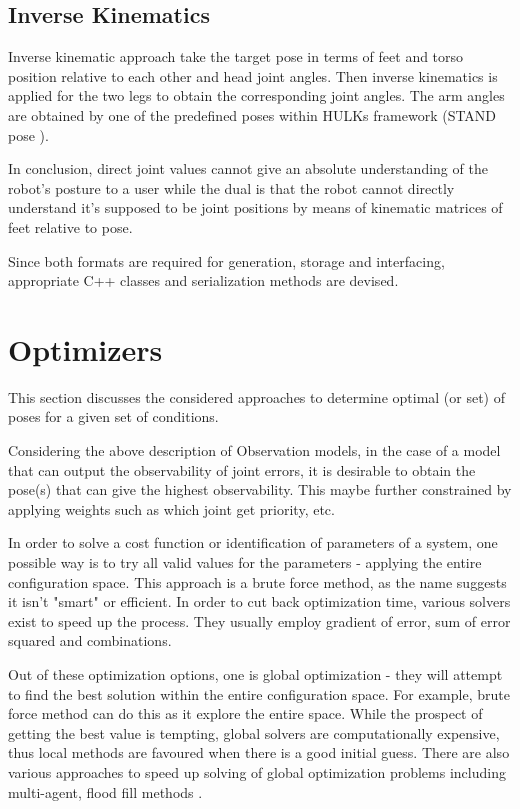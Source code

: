 \documentclass[english, printversion, nomenclature, notitle]{tuvisionthesis} %
\begin{document}
\subsection{Inverse Kinematics}
\label{subsec:inverse_kinematics_gen}

Inverse kinematic approach take the target pose in terms of feet and torso position relative to each other and head joint angles. Then inverse kinematics is applied for the two legs to obtain the corresponding joint angles. The arm angles are obtained by one of the predefined poses within HULKs framework (STAND pose \cite{darshana_adikari_team_2017}).

In conclusion, direct joint values cannot give an absolute understanding of the robot's posture to a user while the dual is that the robot cannot directly understand it's supposed to be joint positions by means of kinematic matrices of feet relative to pose.

Since both formats are required for generation, storage and interfacing, appropriate C++ classes and serialization methods are devised.

\section{Optimizers}

This section discusses the considered approaches to determine optimal (or set) of poses for a given set of conditions.

Considering the above description of Observation models, in the case of a model that can output the observability of joint errors, it is desirable to obtain the pose(s) that can give the highest observability. This maybe further constrained by applying weights such as which joint get priority, etc.

In order to solve a cost function or identification of parameters of a system, one possible way is to try all valid values for the parameters - applying the entire configuration space. This approach is a brute force method, as the name suggests it isn't "smart" or efficient. In order to cut back optimization time, various solvers exist to speed up the process. They usually employ gradient of error, sum of error squared and combinations.

Out of these optimization options, one is global optimization - they will attempt to find the best solution within the entire configuration space. For example, brute force method can do this as it explore the entire space. While the prospect of getting the best value is tempting, global solvers are computationally expensive, thus local methods are favoured when there is a good initial guess. There are also various approaches to speed up solving of global optimization problems including multi-agent, flood fill methods \cite{pso_1, pso_study}.
\end{document}
